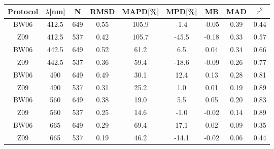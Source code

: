 \documentclass[preview]{standalone}
\begin{document}
\small

\begin{table}
\begin{tabular}{ccccccccc}

\hline
Protocol & $\lambda$[nm] & N   & RMSD & MAPD[\%] & MPD[\%] & MB    & MAD  & $r^2$ \\\hline
 
BW06     & 412.5         & 649 & 0.55 & 105.9    & -1.4    & -0.05 & 0.39 & 0.44\\
Z09      & 412.5         & 537 & 0.42 & 105.7    & -45.5   & -0.18 & 0.33 & 0.57\\\hline
                                                                                        
BW06     & 442.5         & 649 & 0.52 & 61.2     & 6.5     & 0.04  & 0.34 & 0.66\\
Z09      & 442.5         & 537 & 0.36 & 59.4     & -18.6   & -0.09 & 0.26 & 0.77\\\hline
                                                                                             
BW06     & 490           & 649 & 0.49 & 30.1     & 12.4    & 0.13  & 0.28 & 0.81\\
Z09      & 490           & 537 & 0.31 & 25.2     & 1.0     & 0.01  & 0.19 & 0.89\\\hline
                                                                                             
BW06     & 560           & 649 & 0.38 & 19.0     & 5.5     & 0.05  & 0.20 & 0.83\\
Z09      & 560           & 537 & 0.25 & 14.6     & -1.0    & -0.02 & 0.14 & 0.89\\\hline
                                                                                             
BW06     & 665           & 649 & 0.29 & 69.4     & 17.1    & 0.02  & 0.09 & 0.35\\
Z09      & 665           & 537 & 0.19 & 46.2     & -14.1   & -0.02 & 0.06 & 0.44\\\hline
                                                                           

\end{tabular}
\end{table}
\end{document}
